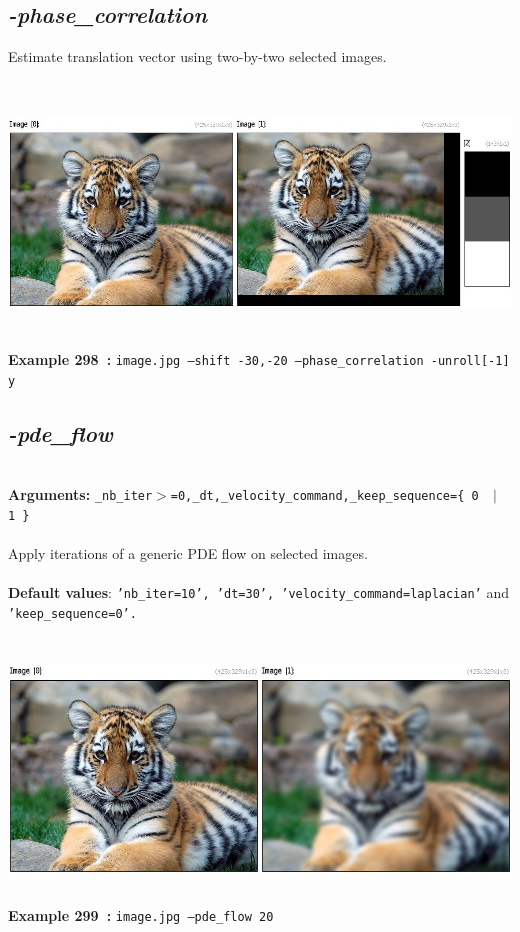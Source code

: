 \documentclass[a4paper,11pt,twoside]{book}
\begin{document}
\subsection{\emph{-phase\_correlation} }\vspace*{-0.5em}
Estimate translation vector using two-by-two selected images.
\begin{center}\includegraphics[keepaspectratio=true,height=7cm,width=\textwidth]{img/gmic_def298.jpg}\\
{\footnotesize \textbf{Example 298~:} \texttt{image.jpg --shift -30,-20 --phase\_correlation -unroll[-1] y}}
\end{center}

\subsection{\emph{-pde\_flow} }\vspace*{-0.5em}
~\\\textbf{Arguments: } 
{\small \texttt{\_nb\_iter$>$=0,\_dt,\_velocity\_command,\_keep\_sequence=\{ 0 ~$|$~ 1 \}}}\\~\\
Apply iterations of a generic PDE flow on selected images.
~\\~\\\textbf{Default values}: {\small \texttt{'nb\_iter=10', 'dt=30', 'velocity\_command=laplacian'} and \texttt{'keep\_sequence=0'.}}
\begin{center}\includegraphics[keepaspectratio=true,height=7cm,width=\textwidth]{img/gmic_def299.jpg}\\
{\footnotesize \textbf{Example 299~:} \texttt{image.jpg --pde\_flow 20}}
\end{center}
\end{document}
